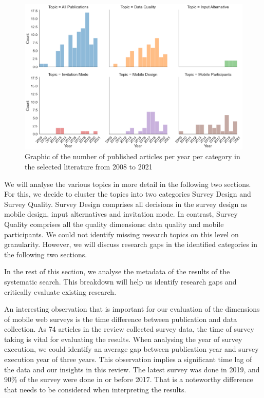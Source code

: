 \begin{figure}
    \centering
    \includegraphics[width=\textwidth]{reports/figures/publications_per_year_per_categories.png}
     \caption{Graphic of the number of published articles per year per category in the selected literature from 2008 to 2021}
    \label{fig: publications_per_year_per_categories}
\end{figure}

We will analyse the various topics in more detail in the following two sections. For this, we decide to cluster the topics into two categories Survey Design and Survey Quality. Survey Design comprises all decisions in the survey design as mobile design, input alternatives and invitation mode. In contrast, Survey Quality comprises all the quality dimensions: data quality and mobile participants. We could not identify missing research topics on this level on granularity. However, we will discuss research gaps in the identified categories in the following two sections. 

In the rest of this section, we analyse the metadata of the results of the systematic search. This breakdown will help us identify research gaps and critically evaluate existing research.

An interesting observation that is important for our evaluation of the dimensions of mobile web surveys is the time difference between publication and data collection. As 74 articles in the review collected survey data, the time of survey taking is vital for evaluating the results. When analysing the year of survey execution, we could identify an average gap between publication year and survey execution year of three years. This observation implies a significant time lag of the data and our insights in this review. The latest survey was done in 2019, and 90\% of the survey were done in or before 2017. That is a noteworthy difference that needs to be considered when interpreting the results.  

